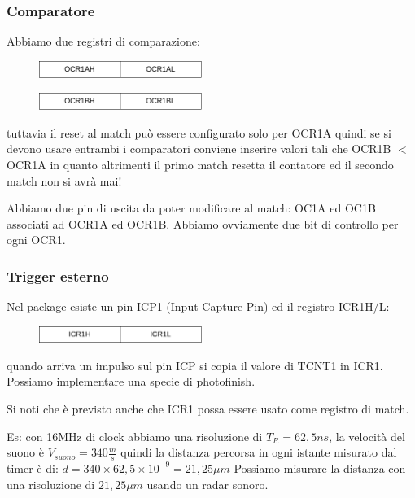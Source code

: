 \subsubsection{Comparatore}
Abbiamo due registri di comparazione:
\begin{figure}[H]
    \centering
    \includegraphics[width=200px]{images/18_Timer/OCR1A.png}
\end{figure}
\begin{figure}[H]
    \centering
    \includegraphics[width=200px]{images/18_Timer/OCR1B.png}
\end{figure}
tuttavia il reset al match può essere configurato solo per OCR1A quindi se si devono usare entrambi i comparatori conviene inserire valori tali che OCR1B $<$ OCR1A in quanto altrimenti il primo match resetta il contatore ed il secondo match non si avrà mai!

Abbiamo due pin di uscita da poter modificare al match: OC1A ed OC1B associati ad OCR1A ed OCR1B.
Abbiamo ovviamente due bit di controllo per ogni OCR1.

\subsubsection{Trigger esterno}
Nel package esiste un pin ICP1 (Input Capture Pin) ed il registro ICR1H/L:
\begin{figure}[H]
    \centering
    \includegraphics[width=200px]{images/18_Timer/ICR1.png}
\end{figure}
quando arriva un impulso sul pin ICP si copia il valore di TCNT1 in ICR1.
Possiamo implementare una specie di photofinish.

Si noti che è previsto anche che ICR1 possa essere usato come registro di match.

Es: con 16MHz di clock abbiamo una risoluzione di $T_R = 62,5 ns$, la velocità del suono è $V_{suono} = 340 \frac{m}{s}$ quindi la distanza percorsa in ogni istante misurato dal timer è di:
$d = 340 \times 62,5 \times 10^{-9} = 21,25 \mu m$
Possiamo misurare la distanza con una risoluzione di $21,25\mu m$ usando un radar sonoro.

